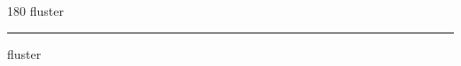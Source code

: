 
\begin{frame}
\begin{center}
\begin{turn}{180}
{\fontsize{2.5cm}{1em}\selectfont fluster}
\end{turn}
\vspace{1em}\par  
\hrule
\vspace{1em}\par  
{\fontsize{2.5cm}{1em}\selectfont fluster}
\end{center}
\end{frame}
